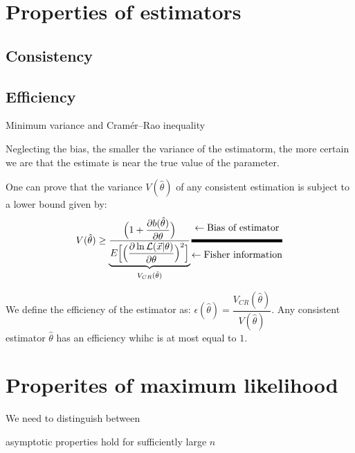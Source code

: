 

\section{Properties of estimators}
\label{sec:point_estimation_prop_of_estimator}

\subsection{Consistency}
\label{subsec:prop_of_estimator_consistency}

\subsection{Efficiency}
\label{subsec:prop_of_estimator_efficiency} Minimum variance and Cramér–Rao inequality

Neglecting the bias, the smaller the variance of the estimatorm, the more certain we are that the estimate is near the true value of the parameter. 

One can prove that the variance $V(\hat{\theta})$ of any consistent estimation is subject to a lower bound given by:
\begin{align}
    V(\hat{\theta}) \geq \underset{V_{CR}(\hat{\theta})}{\underbrace{\dfrac{\Big ( 1 + \dfrac{\partial b(\hat{\theta})}{\partial \theta} \Big )}{E \Big [ \Big ( \dfrac{\partial \ln{\mathcal{L}(\vec{x}|\theta)}}{\partial \theta} \Big )^2 \Big]}}} \genfrac{}{}{3pt}{}{\leftarrow {\text{Bias of estimator}}}{\leftarrow \text{Fisher information}} 
\end{align}

We define the efficiency of the estimator as: $\epsilon(\hat{\theta}) = \dfrac{V_{CR}(\hat\theta)}{V(\hat{\theta})}$. 
Any consistent estimator $\hat{\theta}$ has an efficiency whihc is at most equal to $1$.

\section{Properites of maximum likelihood}
\label{sec:point_estimation_prop_of_max_likelihood}

We need to distinguish between 

\to asymptotic properties \to hold for sufficiently large $n$



